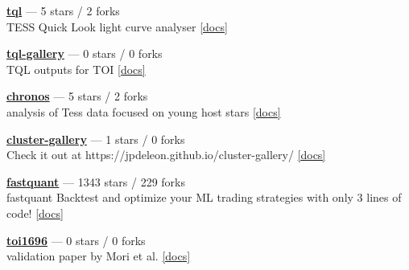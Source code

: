 \item \href{https://github.com/jpdeleon/tql}{{\bf tql}} --- 5 stars / 2 forks \\
TESS Quick Look light curve analyser \href{None}{[docs]}

\item \href{https://github.com/jpdeleon/tql-gallery}{{\bf tql-gallery}} --- 0 stars / 0 forks \\
TQL outputs for TOI \href{None}{[docs]}

\item \href{https://github.com/jpdeleon/chronos}{{\bf chronos}} --- 5 stars / 2 forks \\
analysis of Tess data focused on young host stars \href{None}{[docs]}

\item \href{https://github.com/jpdeleon/cluster-gallery}{{\bf cluster-gallery}} --- 1 stars / 0 forks \\
Check it out at https://jpdeleon.github.io/cluster-gallery/ \href{None}{[docs]}

\item \href{https://github.com/enzoampil/fastquant}{{\bf fastquant}} --- 1343 stars / 229 forks \\
fastquant {\textemdash} Backtest and optimize your ML trading strategies with only 3 lines of code! \href{}{[docs]}

\item \href{https://github.com/jpdeleon/toi1696}{{\bf toi1696}} --- 0 stars / 0 forks \\
validation paper by Mori et al. \href{None}{[docs]}